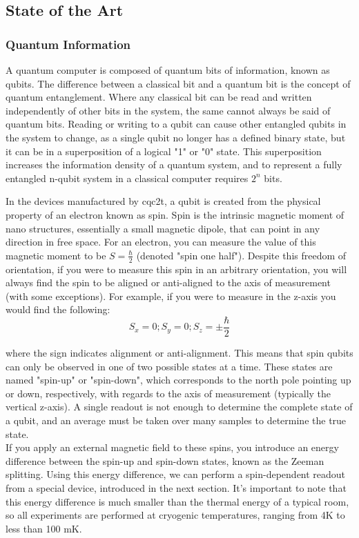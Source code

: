 \subsection{State of the Art}
\subsubsection{Quantum Information}
	A quantum computer is composed of quantum bits of information, known as qubits. The difference between a classical bit and a quantum bit is the concept of quantum entanglement. Where any classical bit can be read and written independently of other bits in the system, the same cannot always be said of quantum bits. Reading or writing to a qubit can cause other entangled qubits in the system to change, as a single qubit no longer has a defined binary state, but it can be in a superposition of a logical "1" or "0" state. This superposition increases the information density of a quantum system, and to represent a fully entangled n-qubit system in a classical computer requires $2^n$ bits. \cite{bennett2000quantum}
	
	In the devices manufactured by \gls{cqc2t}, a qubit is created from the physical property of an electron known as spin. Spin is the intrinsic magnetic moment of nano structures, essentially a small magnetic dipole, that can point in any direction in free space. For an electron, you can measure the value of this magnetic moment to be $S = \frac{\hbar}{2}$ (denoted "spin one half"). Despite this freedom of orientation, if you were to measure this spin in an arbitrary orientation, you will always find the spin to be aligned or anti-aligned to the axis of measurement (with some exceptions). For example, if you were to measure in the z-axis you would find the following:
	$$S_x = 0; S_y = 0; S_z = \pm\frac{\hbar}{2}$$
	
	where the sign indicates alignment or anti-alignment.
	This means that spin qubits can only be observed in one of two possible states at a time. These states are named "spin-up" or "spin-down", which corresponds to the north pole pointing up or down, respectively, with regards to the axis of measurement (typically the vertical z-axis). A single readout is not enough to determine the complete state of a qubit, and an average must be taken over many samples to determine the true state. \\
	\label{zeeman}
	If you apply an external magnetic field to these spins, you introduce an energy difference between the spin-up and spin-down states, known as the Zeeman splitting. Using this energy difference, we can perform a spin-dependent readout from a special device, introduced in the next section. It's important to note that this energy difference is much smaller than the thermal energy of a typical room, so all experiments are performed at cryogenic temperatures, ranging from 4K to less than 100 mK. \cite{morello2010single}
	
